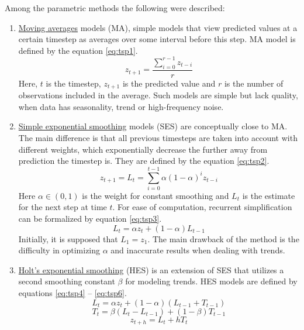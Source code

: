 \documentclass[13pt, a4paper]{article}
\begin{document}
Among the parametric methods the following were described:
\begin{enumerate}
\item \underline{Moving averages} models (MA), simple models that view predicted values at a certain timestep as averages over some interval before this step. MA model is defined by the equation \ref{eq:tsp1}.
\begin{equation} \label{eq:tsp1}
z_{t+1} = \frac{\sum\limits_{i=0}^{r-1}z_{t-i}}{r}
\end{equation}
Here, $t$ is the timestep, $z_{t+1}$ is the predicted value and $r$ is the number of observations included in the average. Such models are simple but lack quality, when data has seasonality, trend or high-frequency noise.
\item \underline{Simple exponential smoothing} models (SES) are conceptually close to MA. The main difference is that all previous timesteps are taken into account with different weights, which exponentially decrease the further away from prediction the timestep is. They are defined by the equation \ref{eq:tsp2}.
\begin{equation} \label{eq:tsp2}
z_{t+1} = L_t = \sum_{i=0}^{t-1} \alpha (1-\alpha)^i z_{t-i}
\end{equation}
Here $\alpha \in (0,1)$ is the weight for constant smoothing and $L_t$ is the estimate for the next step at time $t$. For ease of computation, recurrent simplification can be formalized by equation \ref{eq:tsp3}.
\begin{equation} \label{eq:tsp3}
L_t = \alpha z_t + (1-\alpha) L_{t-1}
\end{equation}
Initially, it is supposed that $L_1 = z_1$. The main drawback of the method is the difficulty in optimizing $\alpha$ and inaccurate results when dealing with trends.
\item \underline{Holt's exponential smoothing} (HES) is an extension of SES that utilizes a second smoothing constant $\beta$ for modeling trends. HES models are defined by equations \ref{eq:tsp4} -- \ref{eq:tsp6}.
\begin{equation} \label{eq:tsp4}
L_t = \alpha z_t + (1-\alpha) (L_{t-1} + T_{t-1})
\end{equation}
\begin{equation} \label{eq:tsp5}
T_t = \beta (L_t - L_{t-1}) + (1-\beta) T_{t-1}
\end{equation}
\begin{equation} \label{eq:tsp6}
z_{t+h} = L_t + hT_t
\end{equation}

\end{enumerate}
\end{document}
